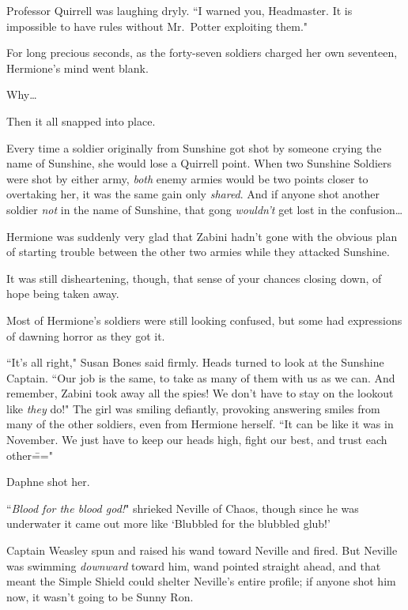 Professor Quirrell was laughing dryly. ``I warned you, Headmaster. It is impossible to have rules without Mr.~Potter exploiting them."

\later

For long precious seconds, as the forty-seven soldiers charged her own seventeen, Hermione's mind went blank.

Why{\ldots}

Then it all snapped into place.

Every time a soldier originally from Sunshine got shot by someone crying the name of Sunshine, she would lose a Quirrell point. When two Sunshine Soldiers were shot by either army, \emph{both} enemy armies would be two points closer to overtaking her, it was the same gain only \emph{shared}. And if anyone shot another soldier \emph{not} in the name of Sunshine, that gong \emph{wouldn't} get lost in the confusion{\ldots}

Hermione was suddenly very glad that Zabini hadn't gone with the obvious plan of starting trouble between the other two armies while they attacked Sunshine.

It was still disheartening, though, that sense of your chances closing down, of hope being taken away.

Most of Hermione's soldiers were still looking confused, but some had expressions of dawning horror as they got it.

``It's all right," Susan Bones said firmly. Heads turned to look at the Sunshine Captain. ``Our job is the same, to take as many of them with us as we can. And remember, Zabini took away all the spies! We don't have to stay on the lookout like \emph{they} do!" The girl was smiling defiantly, provoking answering smiles from many of the other soldiers, even from Hermione herself. ``It can be like it was in November. We just have to keep our heads high, fight our best, and trust each other\==="

Daphne shot her.

\later

``\emph{Blood for the blood god!}" shrieked Neville of Chaos, though since he was underwater it came out more like `Blubbled for the blubbled glub!'

Captain Weasley spun and raised his wand toward Neville and fired. But Neville was swimming \emph{downward} toward him, wand pointed straight ahead, and that meant the Simple Shield could shelter Neville's entire profile; if anyone shot him now, it wasn't going to be Sunny Ron.

